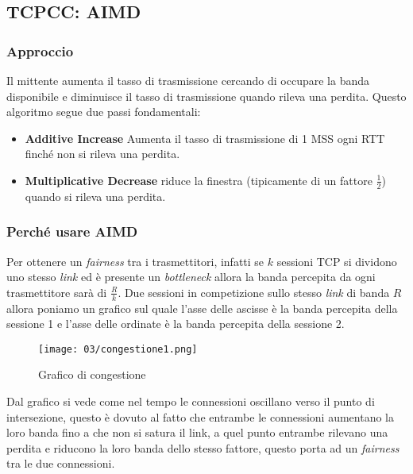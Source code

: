     \subsection[\texttt{TCP CC}: \textit{additive increase multiplicative decrease} (\texttt{AIMD})]{\Acrshort*{TCPCC}: \acrfull*{AIMD}}
        \subsubsection{Approccio}
            Il mittente aumenta il tasso di trasmissione cercando di occupare la banda disponibile e diminuisce il tasso di trasmissione quando rileva una perdita. Questo algoritmo segue due passi fondamentali: \begin{itemize}
                \item \textbf{Additive Increase} Aumenta il tasso di trasmissione di 1 \Acrshort*{MSS} ogni \Acrshort*{RTT} finché non si rileva una perdita.
                \item \textbf{Multiplicative Decrease} riduce la finestra (tipicamente di un fattore $ \frac{1}{2} $) quando si rileva una perdita.
            \end{itemize}
        \subsubsection{Perché usare \Acrshort*{AIMD}}
            Per ottenere un \textit{fairness} tra i trasmettitori, infatti se $ k $ sessioni \Acrshort*{TCP} si dividono uno stesso \textit{link} ed è presente un \textit{bottleneck} allora la banda percepita da ogni trasmettitore sarà di $ \frac{R}{k} $.\newline
            Due sessioni in competizione sullo stesso \textit{link} di banda $ R $ allora poniamo un grafico sul quale l'asse delle ascisse è la banda percepita della sessione 1 e l'asse delle ordinate è la banda percepita della sessione 2. 
            \begin{figure}[H]
                \centering
                \texttt{[image: 03/congestione1.png]}
                \caption{Grafico di congestione}
            \end{figure}
            Dal grafico si vede come nel tempo le connessioni oscillano verso il punto di intersezione, questo è dovuto al fatto che entrambe le connessioni aumentano la loro banda fino a che non si satura il link, a quel punto entrambe rilevano una perdita e riducono la loro banda dello stesso fattore, questo porta ad un \textit{fairness} tra le due connessioni.
